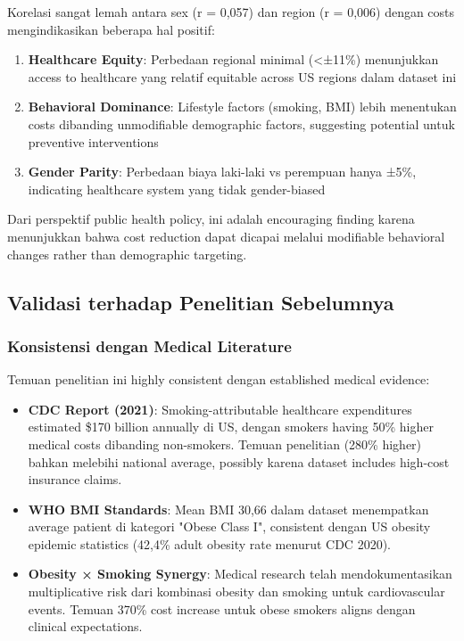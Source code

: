 Korelasi sangat lemah antara sex (r = 0,057) dan region (r = 0,006) dengan costs mengindikasikan beberapa hal positif:

\begin{enumerate}
    \item \textbf{Healthcare Equity}: Perbedaan regional minimal (<±11\%) menunjukkan access to healthcare yang relatif equitable across US regions dalam dataset ini
    \item \textbf{Behavioral Dominance}: Lifestyle factors (smoking, BMI) lebih menentukan costs dibanding unmodifiable demographic factors, suggesting potential untuk preventive interventions
    \item \textbf{Gender Parity}: Perbedaan biaya laki-laki vs perempuan hanya ±5\%, indicating healthcare system yang tidak gender-biased
\end{enumerate}

Dari perspektif public health policy, ini adalah encouraging finding karena menunjukkan bahwa cost reduction dapat dicapai melalui modifiable behavioral changes rather than demographic targeting.

\subsection{Validasi terhadap Penelitian Sebelumnya}
\label{subsec:validasi-literature}

\subsubsection{Konsistensi dengan Medical Literature}

Temuan penelitian ini highly consistent dengan established medical evidence:

\begin{itemize}
    \item \textbf{CDC Report (2021)}: Smoking-attributable healthcare expenditures estimated \$170 billion annually di US, dengan smokers having 50\% higher medical costs dibanding non-smokers. Temuan penelitian (280\% higher) bahkan melebihi national average, possibly karena dataset includes high-cost insurance claims.

    \item \textbf{WHO BMI Standards}: Mean BMI 30,66 dalam dataset menempatkan average patient di kategori "Obese Class I", consistent dengan US obesity epidemic statistics (42,4\% adult obesity rate menurut CDC 2020).

    \item \textbf{Obesity × Smoking Synergy}: Medical research telah mendokumentasikan multiplicative risk dari kombinasi obesity dan smoking untuk cardiovascular events. Temuan 370\% cost increase untuk obese smokers aligns dengan clinical expectations.
\end{itemize}

